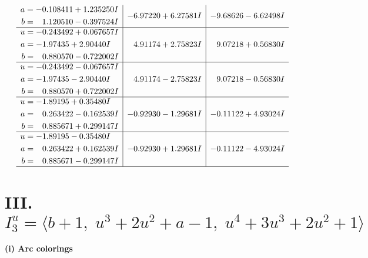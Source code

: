 \documentclass[1p]{elsarticle_modified}
\theoremstyle{definition}
\begin{document}
$$\begin{array}{c|c|c}
\begin{aligned}
a &= -0.108411 + 1.235250 I \\
b &= \phantom{-}1.120510 - 0.397524 I\end{aligned}
 & -6.97220 + 6.27581 I & -9.68626 - 6.62498 I \\ \hline\begin{aligned}
u &= -0.243492 + 0.067657 I \\
a &= -1.97435 + 2.90440 I \\
b &= \phantom{-}0.880570 - 0.722002 I\end{aligned}
 & \phantom{-}4.91174 + 2.75823 I & \phantom{-}9.07218 + 0.56830 I \\ \hline\begin{aligned}
u &= -0.243492 - 0.067657 I \\
a &= -1.97435 - 2.90440 I \\
b &= \phantom{-}0.880570 + 0.722002 I\end{aligned}
 & \phantom{-}4.91174 - 2.75823 I & \phantom{-}9.07218 - 0.56830 I \\ \hline\begin{aligned}
u &= -1.89195 + 0.35480 I \\
a &= \phantom{-}0.263422 - 0.162539 I \\
b &= \phantom{-}0.885671 + 0.299147 I\end{aligned}
 & -0.92930 - 1.29681 I & -0.11122 + 4.93024 I \\ \hline\begin{aligned}
u &= -1.89195 - 0.35480 I \\
a &= \phantom{-}0.263422 + 0.162539 I \\
b &= \phantom{-}0.885671 - 0.299147 I\end{aligned}
 & -0.92930 + 1.29681 I & -0.11122 - 4.93024 I\\
 \hline 
 \end{array}$$\newpage\newpage\renewcommand{\arraystretch}{1}
\centering \section*{III. $I^u_{3}= \langle b+1,\;u^3+2 u^2+a-1,\;u^4+3 u^3+2 u^2+1 \rangle$}
\flushleft \textbf{(i) Arc colorings}\\
\end{document}
